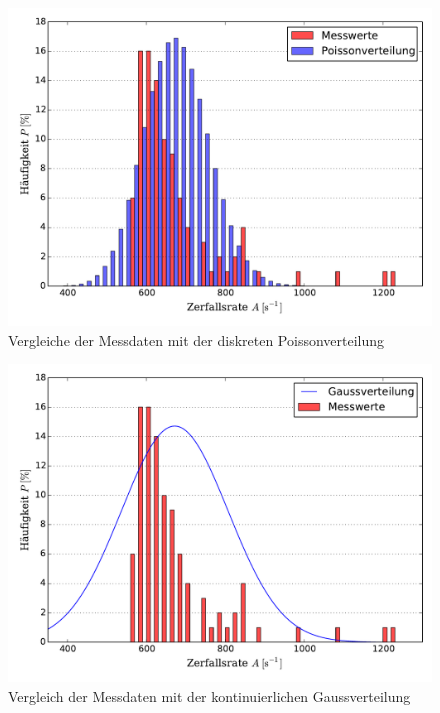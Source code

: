 	\begin{figure}[!h]
		\centering
		\includegraphics[scale=0.7]{Grafiken/VergleichPoisson.pdf}
		\caption{Vergleiche der Messdaten mit der diskreten Poissonverteilung}
		\label{fig:Messdaten_III_Poisson}
	\end{figure}
	
	\begin{figure}[!h]
		\centering
		\includegraphics[scale=0.7]{Grafiken/VergleichGauss.pdf}
		\caption{Vergleich der Messdaten mit der kontinuierlichen Gaussverteilung}
		\label{fig:Messdaten_III_Gauss}
	\end{figure}


